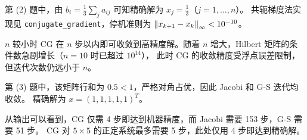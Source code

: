 \documentclass{article}
\begin{document}
\begin{solution}
  第 (2) 题中，由 $b_i = \frac{1}{3}\sum_j a_{ij}$ 可知精确解为 $x_j =
  \frac{1}{3}$（$j = 1, \dots, n$）。
  共轭梯度法实现见 \lstinline{conjugate_gradient}，停机准则为
  $\left\| x_{k+1} - x_k \right\|_\infty < 10^{-10}$。

  
  
  

  $n$ 较小时 CG 在 $n$ 步以内即可收敛到高精度解。随着 $n$ 增大，Hilbert 矩阵的条件数急剧增长（$n=10$
  时已超过 $10^{14}$），
  此时 CG 的收敛精度受浮点误差限制，但迭代次数仍远小于 $n$。

  \bigskip

  第 (3) 题中，该矩阵行和为 $0.5 < 1$，严格对角占优，因此 Jacobi 和 G-S 迭代均收敛。
  精确解为 $x = (1, 1, 1, 1, 1)^T$。

  

  从输出可以看到，CG 仅需 4 步即达到机器精度，而 Jacobi 需要 153 步，G-S 需要 51 步。
  CG 对 $5\times 5$ 的正定系统最多需要 5 步，此处仅用 4 步即达到精确解。
\end{solution}
\end{document}
